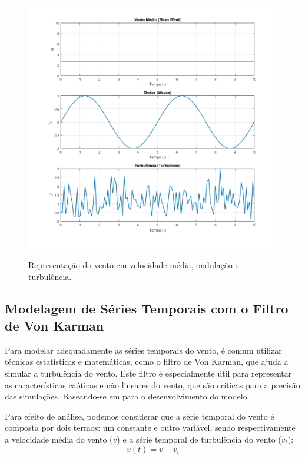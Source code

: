 \begin{figure}[h]
    \caption{Representação do vento em velocidade média, ondulação e turbulência.}
    \centering
    \includegraphics[width=\textwidth]{Figuras/Teorico/vento_sub3.png}
    \label{fig:Vento_sub3}
\end{figure}

\subsection{Modelagem de Séries Temporais com o Filtro de Von Karman}

\par Para modelar adequadamente as séries temporais do vento, é comum utilizar técnicas estatísticas e matemáticas, como o filtro de Von Karman, que ajuda a simular a turbulência do vento. Este filtro é especialmente útil para representar as características caóticas e não lineares do vento, que são críticas para a precisão das simulações. Baseando-se em  para o desenvolvimento do modelo.

\par Para efeito de análise, podemos considerar que a série temporal do vento é composta por dois termos: um constante e outro variável, sendo respectivamente a velocidade média do vento (\(v\)) e a série temporal de turbulência do vento (\(v_{t}\)):
\begin{equation}
 v(t) = v + v_{t}   
 \label{eq:série temporal do vento}
\end{equation}



